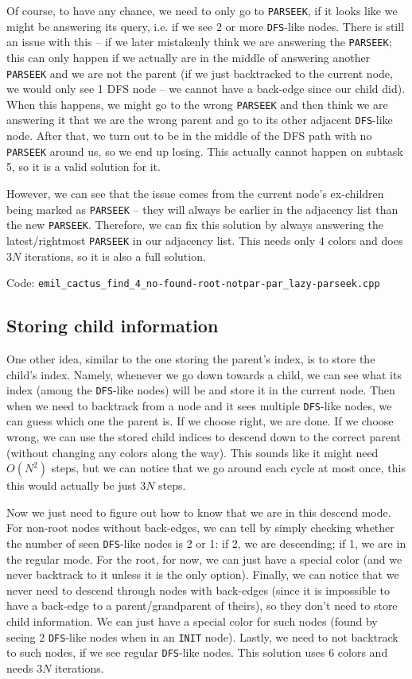 \documentclass{article}
\begin{document}
Of course, to have any chance, we need to only go to \verb|PARSEEK|, if it looks like we might be answering its query, i.e. if we see 2 or more \verb|DFS|-like nodes. There is still an issue with this -- if we later mistakenly think we are answering the \verb|PARSEEK|; this can only happen if we actually are in the middle of answering another \verb|PARSEEK| and we are not the parent (if we just backtracked to the current node, we would only see 1 DFS node -- we cannot have a back-edge since our child did). When this happens, we might go to the wrong \verb|PARSEEK| and then think we are answering it that we are the wrong parent and go to its other adjacent \verb|DFS|-like node. After that, we turn out to be in the middle of the DFS path with no \verb|PARSEEK| around us, so we end up losing. This actually cannot happen on subtask 5, so it is a valid solution for it.

However, we can see that the issue comes from the current node's ex-children being marked as \verb|PARSEEK| -- they will always be earlier in the adjacency list than the new \verb|PARSEEK|. Therefore, we can fix this solution by always answering the latest/rightmost \verb|PARSEEK| in our adjacency list. This needs only $4$ colors and does $3N$ iterations, so it is also a full solution.

Code: \verb|emil_cactus_find_4_no-found-root-notpar-par_lazy-parseek.cpp|

\subsection{Storing child information}

One other idea, similar to the one storing the parent's index, is to store the child's index. Namely, whenever we go down towards a child, we can see what its index (among the \verb|DFS|-like nodes) will be and store it in the current node. Then when we need to backtrack from a node and it sees multiple \verb|DFS|-like nodes, we can guess which one the parent is. If we choose right, we are done. If we choose wrong, we can use the stored child indices to descend down to the correct parent (without changing any colors along the way). This sounds like it might need $O(N^2)$ steps, but we can notice that we go around each cycle at most once, this this would actually be just $3N$ steps.

Now we just need to figure out how to know that we are in this descend mode. For non-root nodes without back-edges, we can tell by simply checking whether the number of seen \verb|DFS|-like nodes is 2 or 1: if 2, we are descending; if 1, we are in the regular mode. For the root, for now, we can just have a special color (and we never backtrack to it unless it is the only option). Finally, we can notice that we never need to descend through nodes with back-edges (since it is impossible to have a back-edge to a parent/grandparent of theirs), so they don't need to store child information. We can just have a special color for such nodes (found by seeing 2 \verb|DFS|-like nodes when in an \verb|INIT| node). Lastly, we need to not backtrack to such nodes, if we see regular \verb|DFS|-like nodes. This solution uses $6$ colors and needs $3N$ iterations.
\end{document}
